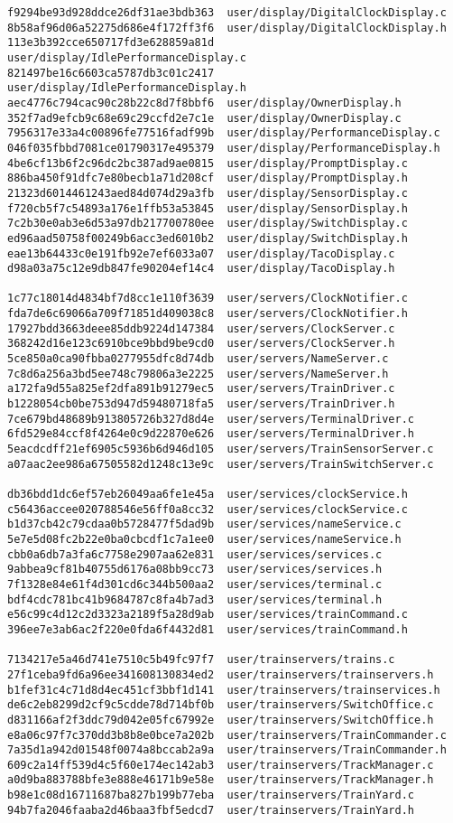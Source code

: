 \documentclass[twoside,a4paper]{refart}
\begin{document}
\begin{verbatim}
f9294be93d928ddce26df31ae3bdb363  user/display/DigitalClockDisplay.c
8b58af96d06a52275d686e4f172ff3f6  user/display/DigitalClockDisplay.h
113e3b392cce650717fd3e628859a81d  user/display/IdlePerformanceDisplay.c
821497be16c6603ca5787db3c01c2417  user/display/IdlePerformanceDisplay.h
aec4776c794cac90c28b22c8d7f8bbf6  user/display/OwnerDisplay.h
352f7ad9efcb9c68e69c29ccfd2e7c1e  user/display/OwnerDisplay.c
7956317e33a4c00896fe77516fadf99b  user/display/PerformanceDisplay.c
046f035fbbd7081ce01790317e495379  user/display/PerformanceDisplay.h
4be6cf13b6f2c96dc2bc387ad9ae0815  user/display/PromptDisplay.c
886ba450f91dfc7e80becb1a71d208cf  user/display/PromptDisplay.h
21323d6014461243aed84d074d29a3fb  user/display/SensorDisplay.c
f720cb5f7c54893a176e1ffb53a53845  user/display/SensorDisplay.h
7c2b30e0ab3e6d53a97db217700780ee  user/display/SwitchDisplay.c
ed96aad50758f00249b6acc3ed6010b2  user/display/SwitchDisplay.h
eae13b64433c0e191fb92e7ef6033a07  user/display/TacoDisplay.c
d98a03a75c12e9db847fe90204ef14c4  user/display/TacoDisplay.h

1c77c18014d4834bf7d8cc1e110f3639  user/servers/ClockNotifier.c
fda7de6c69066a709f71851d409038c8  user/servers/ClockNotifier.h
17927bdd3663deee85ddb9224d147384  user/servers/ClockServer.c
368242d16e123c6910bce9bbd9be9cd0  user/servers/ClockServer.h
5ce850a0ca90fbba0277955dfc8d74db  user/servers/NameServer.c
7c8d6a256a3bd5ee748c79806a3e2225  user/servers/NameServer.h
a172fa9d55a825ef2dfa891b91279ec5  user/servers/TrainDriver.c
b1228054cb0be753d947d59480718fa5  user/servers/TrainDriver.h
7ce679bd48689b913805726b327d8d4e  user/servers/TerminalDriver.c
6fd529e84ccf8f4264e0c9d22870e626  user/servers/TerminalDriver.h
5eacdcdff21ef6905c5936b6d946d105  user/servers/TrainSensorServer.c
a07aac2ee986a67505582d1248c13e9c  user/servers/TrainSwitchServer.c

db36bdd1dc6ef57eb26049aa6fe1e45a  user/services/clockService.h
c56436accee020788546e56ff0a8cc32  user/services/clockService.c
b1d37cb42c79cdaa0b5728477f5dad9b  user/services/nameService.c
5e7e5d08fc2b22e0ba0cbcdf1c7a1ee0  user/services/nameService.h
cbb0a6db7a3fa6c7758e2907aa62e831  user/services/services.c
9abbea9cf81b40755d6176a08bb9cc73  user/services/services.h
7f1328e84e61f4d301cd6c344b500aa2  user/services/terminal.c
bdf4cdc781bc41b9684787c8fa4b7ad3  user/services/terminal.h
e56c99c4d12c2d3323a2189f5a28d9ab  user/services/trainCommand.c
396ee7e3ab6ac2f220e0fda6f4432d81  user/services/trainCommand.h

7134217e5a46d741e7510c5b49fc97f7  user/trainservers/trains.c
27f1ceba9fd6a96ee341608130834ed2  user/trainservers/trainservers.h
b1fef31c4c71d8d4ec451cf3bbf1d141  user/trainservers/trainservices.h
de6c2eb8299d2cf9c5cdde78d714bf0b  user/trainservers/SwitchOffice.c
d831166af2f3ddc79d042e05fc67992e  user/trainservers/SwitchOffice.h
e8a06c97f7c370dd3b8b8e0bce7a202b  user/trainservers/TrainCommander.c
7a35d1a942d01548f0074a8bccab2a9a  user/trainservers/TrainCommander.h
609c2a14ff539d4c5f60e174ec142ab3  user/trainservers/TrackManager.c
a0d9ba883788bfe3e888e46171b9e58e  user/trainservers/TrackManager.h
b98e1c08d16711687ba827b199b77eba  user/trainservers/TrainYard.c
94b7fa2046faaba2d46baa3fbf5edcd7  user/trainservers/TrainYard.h
\end{verbatim}
\end{document}
